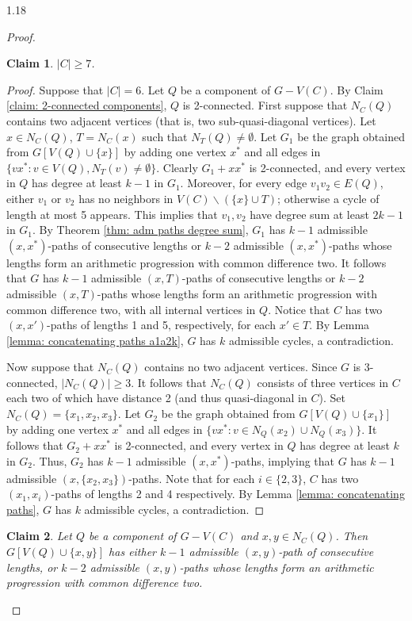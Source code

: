 \documentclass[10pt]{article}
\newtheorem{claim}{Claim}
\begin{document}
\begin{spacing}{1.18}
\begin{proof}
\begin{claim}\label{ClCgeq7}
    $|C|\geqslant 7$.
\end{claim}

\begin{proof}
    Suppose that $|C|=6$. Let $Q$ be a component of $G-V(C)$. By Claim \ref{claim: 2-connected components}, $Q$ is 2-connected. First suppose that $N_C(Q)$ contains two adjacent vertices (that is, two sub-quasi-diagonal vertices). Let $x\in N_C(Q)$, $T=N_C(x)$ such that $N_T(Q)\neq\emptyset$. Let $G_1$ be the graph obtained from $G[V(Q)\cup\{x\}]$ by adding one vertex $x^*$ and all edges in $\{vx^*: v\in V(Q), N_T(v)\neq\emptyset\}$. Clearly $G_1+xx^*$ is 2-connected, and every vertex in $Q$ has degree at least $k-1$ in $G_1$. Moreover, for every edge $v_1v_2\in E(Q)$, either $v_1$ or $v_2$ has no neighbors in $V(C)\backslash(\{x\}\cup T)$; otherwise a cycle of length at most 5 appears. This implies that $v_1,v_2$ have degree sum at least $2k-1$ in $G_1$. By Theorem \ref{thm: adm paths degree sum}, $G_1$ has $k-1$ admissible $(x,x^*)$-paths of consecutive lengths or $k-2$ admissible $(x,x^*)$-paths whose lengths form an arithmetic progression with common difference two. It follows that $G$ has $k-1$ admissible $(x,T)$-paths of consecutive lengths or $k-2$ admissible $(x,T)$-paths whose lengths form an arithmetic progression with common difference two, with all internal vertices in $Q$. Notice that $C$ has two $(x,x')$-paths of lengths 1 and 5, respectively, for each $x'\in T$. By Lemma \ref{lemma: concatenating paths a1a2k}, $G$ has $k$ admissible cycles, a contradiction.
    
    Now suppose that $N_C(Q)$ contains no two adjacent vertices. Since $G$ is 3-connected, $|N_C(Q)|\geqslant 3$. It follows that $N_C(Q)$ consists of three vertices in $C$ each two of which have distance 2 (and thus quasi-diagonal in $C$). Set $N_C(Q)=\{x_1,x_2,x_3\}$. Let $G_2$ be the graph obtained from $G[V(Q)\cup\{x_1\}]$ by adding one vertex $x^*$ and all edges in $\{vx^*: v\in N_Q(x_2)\cup N_Q(x_3)\}$. It follows that $G_2+xx^*$ is 2-connected, and every vertex in $Q$ has degree at least $k$ in $G_2$. Thus, $G_2$ has $k-1$ admissible $(x,x^*)$-paths, implying that $G$ has $k-1$ admissible $(x,\{x_2,x_3\})$-paths. Note that for each $i\in\{2,3\}$, $C$ has two $(x_1,x_i)$-paths of lengths 2 and 4 respectively. By Lemma \ref{lemma: concatenating paths}, $G$ has $k$ admissible cycles, a contradiction.
\end{proof}

\begin{claim}\label{ClQxyAdmissiblePath}
    Let $Q$ be a component of $G-V(C)$ and $x,y\in N_C(Q)$. Then $G[V(Q)\cup\{x,y\}]$ has either $k-1$ admissible $(x,y)$-path of consecutive lengths, or $k-2$ admissible $(x,y)$-paths whose lengths form an arithmetic progression with common difference two.
\end{claim}


\end{proof}
\end{spacing}
\end{document}
